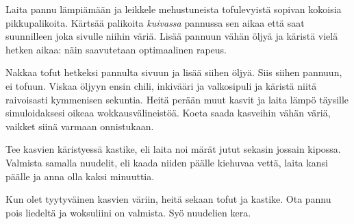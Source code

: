 \begin{recipe}
{        Laita pannu lämpiämään ja leikkele mehustuneista tofulevyistä sopivan kokoisia 
        pikkupalikoita. Kärtsää palikoita \emph{kuivassa} pannussa sen aikaa että saat suunnilleen 
        joka sivulle niihin väriä. Lisää pannuun vähän öljyä ja käristä vielä hetken aikaa: 
        näin saavutetaan optimaalinen rapeus.

        Nakkaa tofut hetkeksi pannulta sivuun ja lisää siihen öljyä. Siis siihen pannuun, ei 
        tofuun. Viskaa öljyyn ensin chili, inkivääri ja valkosipuli ja käristä niitä 
        raivoisasti kymmenisen sekuntia. Heitä perään muut kasvit ja laita lämpö täysille 
        simuloidaksesi oikeaa wokkausvälineistöä. Koeta saada kasveihin vähän väriä, vaikket 
        siinä varmaan onnistukaan. 

        Tee kasvien käristyessä kastike, eli laita noi märät jutut sekasin jossain kipossa. 
        Valmista samalla nuudelit, eli kaada niiden päälle kiehuvaa vettä, laita kansi päälle 
        ja anna olla kaksi minuuttia.

        Kun olet tyytyväinen kasvien väriin, heitä sekaan tofut ja kastike. Ota pannu pois 
        liedeltä ja woksuliini on valmista. Syö nuudelien kera.
    }

    
\end{recipe}
